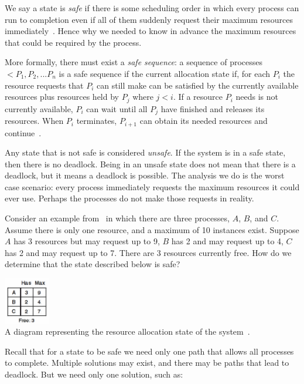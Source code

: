 We say a state is \textit{safe} if there is some scheduling order in which every process can run to completion even if all of them suddenly request their maximum resources immediately~\cite{mos}. Hence why we needed to know in advance the maximum resources that could be required by the process. 

More formally, there must exist a \textit{safe sequence}: a sequence of processes $<P_{1}, P_{2}, ... P_{n}$ is a safe sequence if the current allocation state if, for each $P_{i}$ the resource requests that $P_{i}$ can still make can be satisfied by the currently available resources plus resources held by $P_{j}$ where $j < i$. If a resource $P_{i}$ needs is not currently available, $P_{i}$ can wait until all $P_{j}$ have finished and releases its resources. When $P_{i}$ terminates, $P_{i+1}$ can obtain its needed resources and continue~\cite{osc}.

Any state that is not safe is considered \textit{unsafe}. If the system is in a safe state, then there is no deadlock. Being in an unsafe state does not mean that there is a deadlock, but it means a deadlock is possible. The analysis we do is the worst case scenario: every process immediately requests the maximum resources it could ever use. Perhaps the processes do not make those requests in reality.

Consider an example from~\cite{mos} in which there are three processes, $A$, $B$, and $C$. Assume there is only one resource, and a maximum of 10 instances exist. Suppose $A$ has 3 resources but may request up to 9, $B$ has 2 and may request up to 4, $C$ has 2 and may request up to 7. There are 3 resources currently free. How do we determine that the state described below is safe?

\begin{center}
\includegraphics[width=0.15\textwidth]{images/safe-state-initial.png}\\
A diagram representing the resource allocation state of the system~\cite{mos}.
\end{center}

Recall that for a state to be safe we need only one path that allows all processes to complete. Multiple solutions may exist, and there may be paths that lead to deadlock. But we need only one solution, such as:

